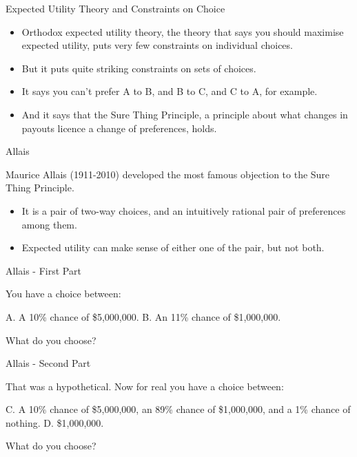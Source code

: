 \documentclass[
  ignorenonframetext,
]{beamer}
\providecommand{\tightlist}{%
  \setlength{\itemsep}{0pt}\setlength{\parskip}{0pt}}
\renewcommand{\,}{\text{, }}
\begin{document}
\begin{frame}{Expected Utility Theory and Constraints on Choice}
\protect\hypertarget{expected-utility-theory-and-constraints-on-choice}{}

\begin{itemize}
\tightlist
\item
  Orthodox expected utility theory, the theory that says you should
  maximise expected utility, puts very few constraints on individual
  choices.
\item
  But it puts quite striking constraints on sets of choices.
\item
  It says you can't prefer A to B, and B to C, and C to A, for example.
\item
  And it says that the Sure Thing Principle, a principle about what
  changes in payouts licence a change of preferences, holds.
\end{itemize}

\end{frame}

\begin{frame}{Allais}
\protect\hypertarget{allais}{}

Maurice Allais (1911-2010) developed the most famous objection to the
Sure Thing Principle.

\begin{itemize}
\tightlist
\item
  It is a pair of two-way choices, and an intuitively rational pair of
  preferences among them.
\item
  Expected utility can make sense of either one of the pair, but not
  both.
\end{itemize}

\end{frame}

\begin{frame}{Allais - First Part}
\protect\hypertarget{allais---first-part}{}

You have a choice between:

A. A 10\% chance of \$5,000,000. B. An 11\% chance of \$1,000,000.

What do you choose?

\end{frame}

\begin{frame}{Allais - Second Part}
\protect\hypertarget{allais---second-part}{}

That was a hypothetical. Now for real you have a choice between:

C. A 10\% chance of \$5,000,000, an 89\% chance of \$1,000,000, and a
1\% chance of nothing. D. \$1,000,000.

What do you choose?

\end{frame}
\end{document}
